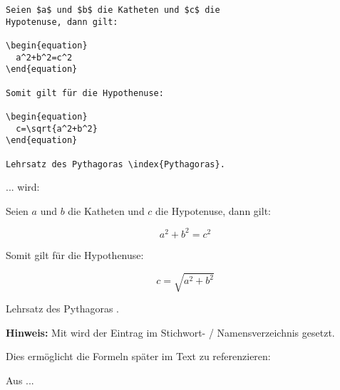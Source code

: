 \begin{tcolorbox}[width=\textwidth,colback={light-gray},title={Latex-Text},colbacktitle=gray,coltitle=white]

\begin{verbatim}
Seien $a$ und $b$ die Katheten und $c$ die
Hypotenuse, dann gilt: 

\begin{equation}
  a^2+b^2=c^2 
\end{equation}
 
Somit gilt für die Hypothenuse: 

\begin{equation}
  c=\sqrt{a^2+b^2} 
\end{equation}

Lehrsatz des Pythagoras \index{Pythagoras}. 
\end{verbatim}

\end{tcolorbox}

... wird:

\begin{tcolorbox}[width=\textwidth,colback={light-gray},title={Print-Text},colbacktitle=gray,coltitle=white]

Seien $a$ und $b$ die Katheten und $c$ die
Hypotenuse, dann gilt: 

\begin{equation}
  a^2+b^2=c^2 
\end{equation}
 
Somit gilt für die Hypothenuse: 

\begin{equation}
  c=\sqrt{a^2+b^2} 
\end{equation}

Lehrsatz des Pythagoras . 

\end{tcolorbox}


\textbf{Hinweis:} Mit wird der Eintrag im Stichwort- / Namensverzeichnis gesetzt.



\pagebreak 
Dies ermöglicht die Formeln später im Text zu referenzieren: 

Aus ...

